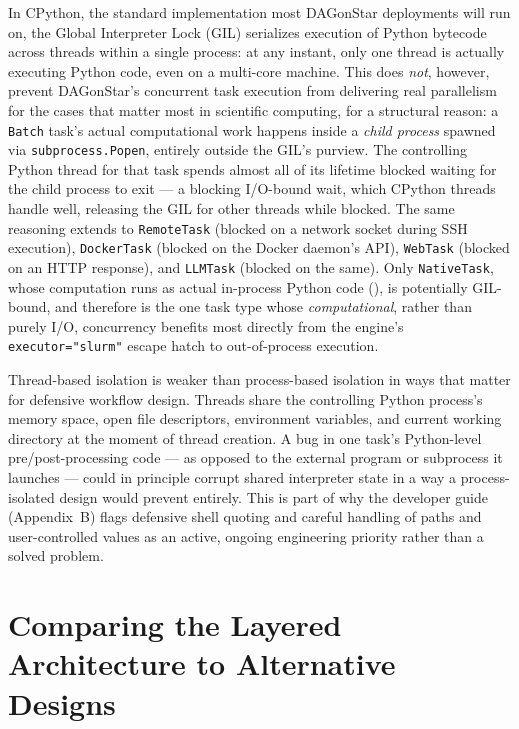 In CPython, the standard implementation most DAGonStar deployments will run
on, the Global Interpreter Lock (GIL) serializes execution of Python
bytecode across threads within a single process: at any instant, only one
thread is actually executing Python code, even on a multi-core machine. This
does \emph{not}, however, prevent DAGonStar's concurrent task execution from
delivering real parallelism for the cases that matter most in scientific
computing, for a structural reason: a \texttt{Batch} task's actual
computational work happens inside a \emph{child process} spawned via
\texttt{subprocess.Popen}, entirely outside the GIL's purview. The
controlling Python thread for that task spends almost all of its lifetime
blocked waiting for the child process to exit --- a blocking I/O-bound wait,
which CPython threads handle well, releasing the GIL for other threads while
blocked. The same reasoning extends to \texttt{RemoteTask} (blocked on a
network socket during SSH execution), \texttt{DockerTask} (blocked on the
Docker daemon's API), \texttt{WebTask} (blocked on an HTTP response), and
\texttt{LLMTask} (blocked on the same). Only \texttt{NativeTask}, whose
computation runs as actual in-process Python code (),
is potentially GIL-bound, and therefore is the one task type whose
\emph{computational}, rather than purely I/O, concurrency benefits most
directly from the engine's \texttt{executor="slurm"} escape hatch to
out-of-process execution.

\begin{cautionbox}
Thread-based isolation is weaker than process-based isolation in ways that
matter for defensive workflow design. Threads share the controlling Python
process's memory space, open file descriptors, environment variables, and
current working directory at the moment of thread creation. A bug in one
task's Python-level pre/post-processing code --- as opposed to the external
program or subprocess it launches --- could in principle corrupt shared
interpreter state in a way a process-isolated design would prevent
entirely. This is part of why the developer guide (Appendix~B) flags
defensive shell quoting and careful handling of paths and user-controlled
values as an active, ongoing engineering priority rather than a solved
problem.
\end{cautionbox}

\section{Comparing the Layered Architecture to Alternative Designs}


